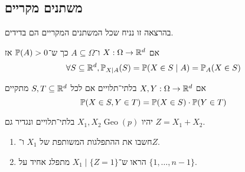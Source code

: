\subsection{משתנים מקריים}
בהרצאה זו נניח שכל המשתנים המקריים הם בדידים.
\begin{definition}
	אם $X : \Omega \to \mathbb{R}^d$ ו־$A \subseteq \Omega$ כך ש־$\mathbb{P}(A) > 0$ אז
	\[
		\forall S \subseteq \mathbb{R}^d, \mathbb{P}_{X \mid A}(S) = \mathbb{P}(X \in S \mid A) = \mathbb{P}_A(X \in S)
	\]
\end{definition}
\begin{definition}
	אם $X, Y : \Omega \to \mathbb{R}^d$ בלתי־תלויים אם לכל $S, T \subseteq \mathbb{R}^d$ מתקיים
	\[
		\mathbb{P}(X \in S, Y \in T) = \mathbb{P}(X \in S) \cdot \mathbb{P}(Y \in T)
	\]
\end{definition}
\begin{exercise}
	יהיו $X_1, X_2 \operatorname{Geo}(p)$ בלתי־תלויים ונגדיר גם $Z = X_1 + X_2$.
	\begin{enumerate}
		\item חשבו את ההתפלגות המשותפת של $X_1$ ו־$Z$.
		\item הראו ש־$X_1 \mid \{ Z = 1 \}$ מתפלג אחיד על $\{1, \dots, n - 1\}$.
	\end{enumerate}
\end{exercise}
